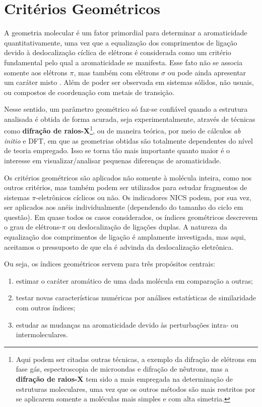 \section{Critérios Geométricos}

A geometria molecular é um fator primordial para determinar a aromaticidade quantitativamente, uma vez que a equalização dos comprimentos de ligação devido à deslocalização cíclica de elétrons é considerada como um critério fundamental pelo qual a aromaticidade se manifesta. Esse fato não se associa somente aos elétrons $\pi$, mas também com elétrons $\sigma$ ou pode ainda apresentar um caráter misto \autocite{Evans1938, Evans1938a, Evans1939}. Além de poder ser observada em sistemas sólidos, não usuais, ou compostos de coordenação com metais de transição.

Nesse sentido, um parâmetro geométrico só faz-se confiável quando a estrutura analisada é obtida de forma acurada, seja experimentalmente, através de técnicas como \textbf{difração de raios-X}\footnote{Aqui podem ser citadas outras técnicas, a exemplo da difração de elétrons em fase gás, espectroscopia de microondas e difração de nêutrons, mas a \textbf{difração de raios-X} tem sido a mais empregada na determinação de estruturas moleculares, uma vez que os outros métodos são mais restritos por se aplicarem somente a moléculas mais simples e com alta simetria.}, ou de maneira teórica, por meio de cálculos \textit{ab initio} e \gls{DFT}, em que as geometrias obtidas são totalmente dependentes do nível de teoria empregado. Isso se torna tão mais importante quanto maior é o interesse em visualizar/analisar pequenas diferenças de aromaticidade.

Os critérios geométricos são aplicados não somente à molécula inteira, como nos outros critérios, mas também podem ser utilizados para estudar fragmentos de sistemas $\pi$-eletrônicos cíclicos ou não. Os indicadores \gls{NICS} podem, por sua vez, ser aplicados aos anéis individualmente (dependendo do tamanho do ciclo em questão). Em quase todos os casos considerados, os índices geométricos descrevem o grau de elétrons-$\pi$ ou deslocalização de ligações duplas. A natureza da equalização dos comprimentos de ligação é amplamente investigada, mas aqui, aceitamos o pressuposto de que ela é advinda da deslocalização eletrônica.

Ou seja, os índices geométricos servem para três propósitos centrais:

\begin{enumerate}
    \item estimar o caráter aromático de uma dada molécula em comparação a outras;
    \item testar novas características numéricas por análises estatísticas de similaridade com outros índices;
    \item estudar as mudanças na aromaticidade devido às perturbações intra- ou intermoleculares.
\end{enumerate}

